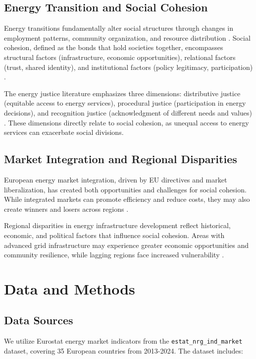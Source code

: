 \documentclass[11pt,a4paper]{article}
\begin{document}
\subsection{Energy Transition and Social Cohesion}

Energy transitions fundamentally alter social structures through changes in employment patterns, community organization, and resource distribution \citep{heffron2021}. Social cohesion, defined as the bonds that hold societies together, encompasses structural factors (infrastructure, economic opportunities), relational factors (trust, shared identity), and institutional factors (policy legitimacy, participation) \citep{chan2006}.

The energy justice literature emphasizes three dimensions: distributive justice (equitable access to energy services), procedural justice (participation in energy decisions), and recognition justice (acknowledgment of different needs and values) \citep{jenkins2016}. These dimensions directly relate to social cohesion, as unequal access to energy services can exacerbate social divisions.

\subsection{Market Integration and Regional Disparities}

European energy market integration, driven by EU directives and market liberalization, has created both opportunities and challenges for social cohesion. While integrated markets can promote efficiency and reduce costs, they may also create winners and losers across regions \citep{newbery2018}.

Regional disparities in energy infrastructure development reflect historical, economic, and political factors that influence social cohesion. Areas with advanced grid infrastructure may experience greater economic opportunities and community resilience, while lagging regions face increased vulnerability \citep{monstadt2009}.

\section{Data and Methods}

\subsection{Data Sources}

We utilize Eurostat energy market indicators from the \texttt{estat\_nrg\_ind\_market} dataset, covering 35 European countries from 2013-2024. The dataset includes:
\end{document}

